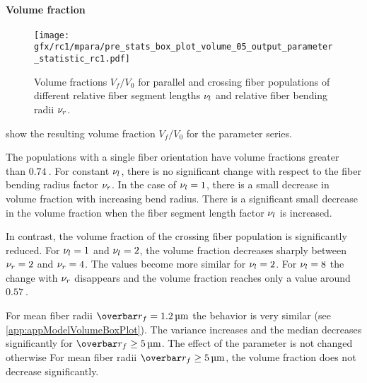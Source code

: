 \paragraph{Volume fraction}
%
\begin{figure}[t]
\centering
\texttt{[image: gfx/rc1/mpara/pre\_stats\_box\_plot\_volume\_05\_output\_parameter\_statistic\_rc1.pdf]}
\caption{Volume fractions $V_f/V_0$ for parallel \pfbs{} and crossing \cfbs{} fiber populations of different relative fiber segment lengths $\textnormal{$\nu_{l}$}$ and relative fiber bending radii $\textnormal{$\nu_{r}$}$.}
\label{fig:psbp1}
\end{figure}
 show the resulting volume fraction $V_f/V_0$ for the parameter series.
\par
%
The populations with a single fiber orientation \pfbs{} have volume fractions greater than $\SI{0.74}{}$.
For constant $\textnormal{$\nu_{l}$}$, there is no significant change with respect to the fiber bending radius factor $\textnormal{$\nu_{r}$}$.
In the case of $\textnormal{$\nu_{l}$} = \SI{1}{}$, there is a small decrease in volume fraction with increasing bend radius.
There is a significant small decrease in the volume fraction when the fiber segment length factor $\textnormal{$\nu_{l}$}$ is increased.
\par
%
In contrast, the volume fraction of the crossing fiber population \cfbs{} is significantly reduced.
For $\textnormal{$\nu_{l}$}=\SI{1}{}$ and $\textnormal{$\nu_{l}$}=\SI{2}{}$, the volume fraction decreases sharply between $\textnormal{$\nu_{r}$} = \SI{2}{}$ and $\textnormal{$\nu_{r}$} = \SI{4}{}$.
The values become more similar for $\textnormal{$\nu_{l}$}=\SI{2}{}$.
For $\textnormal{$\nu_{l}$}=\SI{8}{}$ the change with $\textnormal{$\nu_{r}$}$ disappears and the volume fraction reaches only a value around $\SI{0.57}{}$.
\par
%
For mean fiber radii $\fiberRadiusMean = \SIlist{1,2}{\micro\meter}$ the behavior is very similar (see \cref{app:appModelVolumeBoxPlot}).
The variance increases and the median decreases significantly for $\fiberRadiusMean \geq \SI{5}{\micro\meter}$.
The effect of the parameter is not changed otherwise
For mean fiber radii $\fiberRadiusMean \geq \SI{5}{\micro\meter}$, the volume fraction does not decrease significantly.
% 
% 
% 
